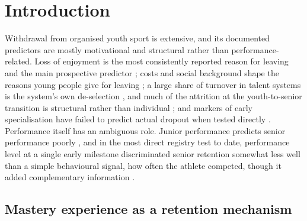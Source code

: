 \documentclass[12pt,a4paper]{article}
\begin{document}
\newpage

\section{Introduction}

Withdrawal from organised youth sport is extensive, and its documented predictors are mostly motivational and structural rather than performance-related. Loss of enjoyment is the most consistently reported reason for leaving \citep{crane2015} and the main prospective predictor \citep{vanyperen2021}; costs and social background shape the reasons young people give for leaving \citep{espedalen2022}; a large share of turnover in talent systems is the system's own de-selection \citep{gullichbarth2026}, and much of the attrition at the youth-to-senior transition is structural rather than individual \citep{filo2026}; and markers of early specialisation have failed to predict actual dropout when tested directly \citep{larson2019}. Performance itself has an ambiguous role. Junior performance predicts senior performance poorly \citep{kearney2018,barth2022,gullich2025}, and in the most direct registry test to date, performance level at a single early milestone discriminated senior retention somewhat less well than a simple behavioural signal, how often the athlete competed, though it added complementary information \citep{guttormsen2026dropout}.

\subsection{Mastery experience as a retention mechanism}
\end{document}
